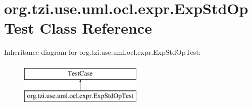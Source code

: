 \hypertarget{classorg_1_1tzi_1_1use_1_1uml_1_1ocl_1_1expr_1_1_exp_std_op_test}{\section{org.\-tzi.\-use.\-uml.\-ocl.\-expr.\-Exp\-Std\-Op\-Test Class Reference}
\label{classorg_1_1tzi_1_1use_1_1uml_1_1ocl_1_1expr_1_1_exp_std_op_test}
}
Inheritance diagram for org.\-tzi.\-use.\-uml.\-ocl.\-expr.\-Exp\-Std\-Op\-Test\-:\begin{figure}[H]
\begin{center}
\leavevmode
\includegraphics[height=2.000000cm]{classorg_1_1tzi_1_1use_1_1uml_1_1ocl_1_1expr_1_1_exp_std_op_test}
\end{center}
\end{figure}
